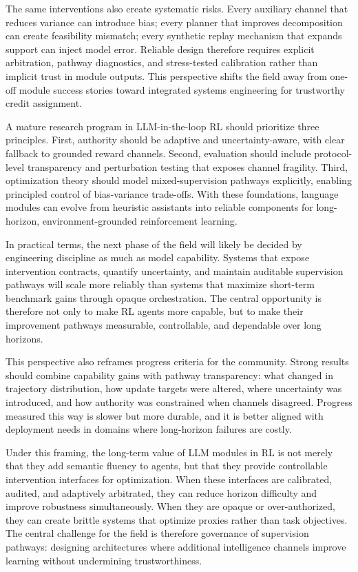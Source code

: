 \documentclass[pdflatex,sn-mathphys-num]{sn-jnl}
\begin{document}
The same interventions also create systematic risks. Every auxiliary channel that reduces variance can introduce bias; every planner that improves decomposition can create feasibility mismatch; every synthetic replay mechanism that expands support can inject model error. Reliable design therefore requires explicit arbitration, pathway diagnostics, and stress-tested calibration rather than implicit trust in module outputs. This perspective shifts the field away from one-off module success stories toward integrated systems engineering for trustworthy credit assignment.

A mature research program in LLM-in-the-loop RL should prioritize three principles. First, authority should be adaptive and uncertainty-aware, with clear fallback to grounded reward channels. Second, evaluation should include protocol-level transparency and perturbation testing that exposes channel fragility. Third, optimization theory should model mixed-supervision pathways explicitly, enabling principled control of bias-variance trade-offs. With these foundations, language modules can evolve from heuristic assistants into reliable components for long-horizon, environment-grounded reinforcement learning.

In practical terms, the next phase of the field will likely be decided by engineering discipline as much as model capability. Systems that expose intervention contracts, quantify uncertainty, and maintain auditable supervision pathways will scale more reliably than systems that maximize short-term benchmark gains through opaque orchestration. The central opportunity is therefore not only to make RL agents more capable, but to make their improvement pathways measurable, controllable, and dependable over long horizons.

This perspective also reframes progress criteria for the community. Strong results should combine capability gains with pathway transparency: what changed in trajectory distribution, how update targets were altered, where uncertainty was introduced, and how authority was constrained when channels disagreed. Progress measured this way is slower but more durable, and it is better aligned with deployment needs in domains where long-horizon failures are costly.

Under this framing, the long-term value of LLM modules in RL is not merely that they add semantic fluency to agents, but that they provide controllable intervention interfaces for optimization. When these interfaces are calibrated, audited, and adaptively arbitrated, they can reduce horizon difficulty and improve robustness simultaneously. When they are opaque or over-authorized, they can create brittle systems that optimize proxies rather than task objectives. The central challenge for the field is therefore governance of supervision pathways: designing architectures where additional intelligence channels improve learning without undermining trustworthiness.
\end{document}
